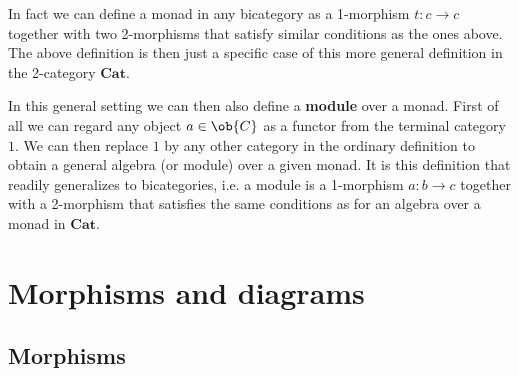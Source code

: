     \begin{remark}
        In fact we can define a monad in any bicategory as a 1-morphism $t:c\rightarrow c$ together with two 2-morphisms that satisfy similar conditions as the ones above. The above definition is then just a specific case of this more general definition in the 2-category $\mathbf{Cat}$.

        In this general setting we can then also define a \textbf{module} over a monad. First of all we can regard any object $a\in\ob{C}$ as a functor from the terminal category $1$. We can then replace $1$ by any other category in the ordinary definition to obtain a general algebra (or module) over a given monad. It is this definition that readily generalizes to bicategories, i.e. a module is a 1-morphism $a:b\rightarrow c$ together with a 2-morphism that satisfies the same conditions as for an algebra over a monad in $\mathbf{Cat}$.
    \end{remark}

\section{Morphisms and diagrams}\label{cat:section:morphisms}
\subsection{Morphisms}


